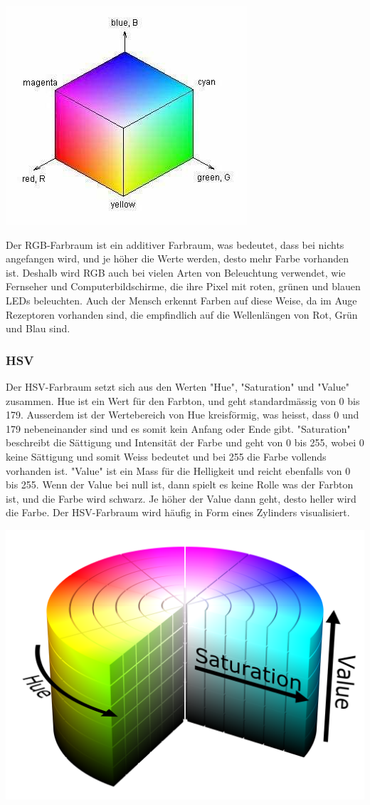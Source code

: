 \documentclass[a4paper, 12pt]{article}
\begin{document}
\includegraphics[scale=0.5]{RGB_Wuerfel}

 Der RGB-Farbraum ist ein additiver Farbraum, was bedeutet, dass bei nichts angefangen wird, und je höher die Werte werden, desto mehr Farbe vorhanden ist. Deshalb wird RGB auch bei vielen Arten von Beleuchtung verwendet, wie Fernseher und Computerbildschirme, die ihre Pixel mit roten, grünen und blauen LEDs beleuchten. Auch der Mensch erkennt Farben auf diese Weise, da im Auge Rezeptoren vorhanden sind, die empfindlich auf die Wellenlängen von Rot, Grün und Blau sind.
\subsubsection{HSV}
Der HSV-Farbraum setzt sich aus den Werten "Hue", "Saturation" und "Value" zusammen. Hue ist ein Wert für den Farbton, und geht standardmässig von 0 bis 179. Ausserdem ist der Wertebereich von Hue kreisförmig, was heisst, dass 0 und 179 nebeneinander sind und es somit kein Anfang oder Ende gibt. "Saturation" beschreibt die Sättigung und Intensität der Farbe und geht von 0 bis 255, wobei 0 keine Sättigung und somit Weiss bedeutet und bei 255 die Farbe vollends vorhanden ist. "Value" ist ein Mass für die Helligkeit und reicht ebenfalls von 0 bis 255. Wenn der Value bei null ist, dann spielt es keine Rolle was der Farbton ist, und die Farbe wird schwarz. Je höher der Value dann geht, desto heller wird die Farbe. Der HSV-Farbraum wird häufig in Form eines Zylinders visualisiert.

\includegraphics[scale=0.07]{HSV_Zylinder} 
\end{document}
